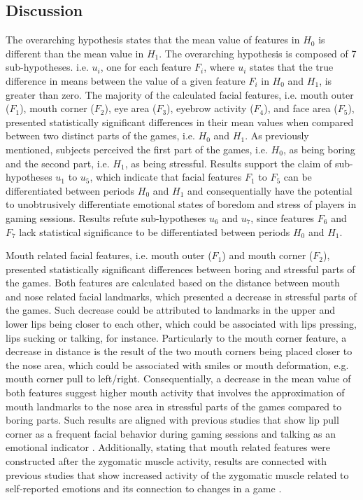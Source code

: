 \subsection{Discussion}

The overarching hypothesis states that the mean value of features in $H_0$ is different than the mean value in $H_1$. The overarching hypothesis is composed of 7 sub-hypotheses. i.e. $u_i$, one for each feature $F_i$, where $u_i$ states that the true difference in means between the value of a given feature $F_i$ in $H_0$ and $H_1$, is greater than zero. The majority of the calculated facial features, i.e. mouth outer ($F_1$), mouth corner ($F_2$), eye area ($F_3$), eyebrow activity ($F_4$), and face area ($F_5$), presented statistically significant differences in their mean values when compared between two distinct parts of the games, i.e. $H_0$ and $H_1$. As previously mentioned, subjects perceived the first part of the games, i.e. $H_0$, as being boring and the second part, i.e. $H_1$, as being stressful. Results support the claim of sub-hypotheses $u_1$ to $u_5$, which indicate that facial features $F_1$ to $F_5$ can be differentiated between periods $H_0$ and $H_1$ and consequentially have the potential to unobtrusively differentiate emotional states of boredom and stress of players in gaming sessions. Results refute sub-hypotheses $u_6$ and $u_7$, since features $F_6$ and $F_7$ lack statistical significance to be differentiated between periods $H_0$ and $H_1$.

Mouth related facial features, i.e. mouth outer ($F_1$) and mouth corner ($F_2$), presented statistically significant differences between boring and stressful parts of the games. Both features are calculated based on the distance between mouth and nose related facial landmarks, which presented a decrease in stressful parts of the games. Such decrease could be attributed to landmarks in the upper and lower lips being closer to each other, which could be associated with lips pressing, lips sucking or talking, for instance. Particularly to the mouth corner feature, a decrease in distance is the result of the two mouth corners being placed closer to the nose area, which could be associated with smiles or mouth deformation, e.g. mouth corner pull to left/right. Consequentially, a decrease in the mean value of both features suggest higher mouth activity that involves the approximation of mouth landmarks to the nose area in stressful parts of the games compared to boring parts. Such results are aligned with previous studies that show lip pull corner as a frequent facial behavior during gaming sessions \parencite{kaiser1994multi} and talking as an emotional indicator \parencite{blom2014towards}. Additionally, stating that mouth related features were constructed after the zygomatic muscle activity, results are connected with previous studies that show increased activity of the zygomatic muscle related to self-reported emotions \parencite{tijs2008dynamic} and its connection to changes in a game \parencite{ravaja20051}.

